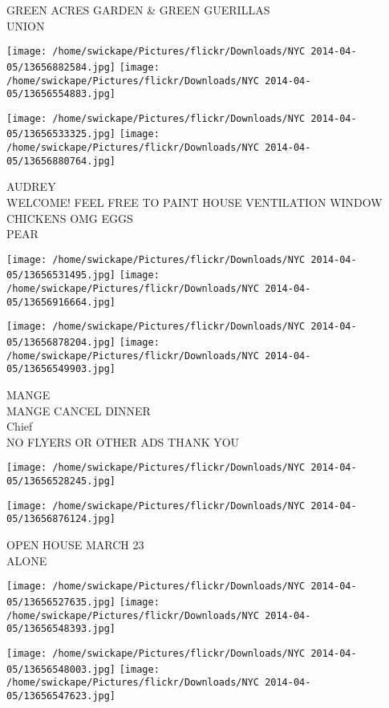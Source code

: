 \documentclass[10pt,letterpaper]{article}
\begin{document}
GREEN ACRES GARDEN \& GREEN GUERILLAS\\
UNION
\pagebreak

\texttt{[image: /home/swickape/Pictures/flickr/Downloads/NYC 2014-04-05/13656882584.jpg]}
\texttt{[image: /home/swickape/Pictures/flickr/Downloads/NYC 2014-04-05/13656554883.jpg]}

\texttt{[image: /home/swickape/Pictures/flickr/Downloads/NYC 2014-04-05/13656533325.jpg]}
\texttt{[image: /home/swickape/Pictures/flickr/Downloads/NYC 2014-04-05/13656880764.jpg]}

AUDREY\\
WELCOME!  FEEL FREE TO PAINT HOUSE  VENTILATION WINDOW\\
CHICKENS OMG EGGS\\
PEAR
\pagebreak

\texttt{[image: /home/swickape/Pictures/flickr/Downloads/NYC 2014-04-05/13656531495.jpg]}
\texttt{[image: /home/swickape/Pictures/flickr/Downloads/NYC 2014-04-05/13656916664.jpg]}

\texttt{[image: /home/swickape/Pictures/flickr/Downloads/NYC 2014-04-05/13656878204.jpg]}
\texttt{[image: /home/swickape/Pictures/flickr/Downloads/NYC 2014-04-05/13656549903.jpg]}

MANGE\\
MANGE CANCEL DINNER\\
Chief\\
NO FLYERS OR OTHER ADS THANK YOU
\pagebreak

\texttt{[image: /home/swickape/Pictures/flickr/Downloads/NYC 2014-04-05/13656528245.jpg]}

\vspace{0.25in}
\texttt{[image: /home/swickape/Pictures/flickr/Downloads/NYC 2014-04-05/13656876124.jpg]}

OPEN HOUSE MARCH 23\\
ALONE
\pagebreak

\texttt{[image: /home/swickape/Pictures/flickr/Downloads/NYC 2014-04-05/13656527635.jpg]}
\texttt{[image: /home/swickape/Pictures/flickr/Downloads/NYC 2014-04-05/13656548393.jpg]}

\texttt{[image: /home/swickape/Pictures/flickr/Downloads/NYC 2014-04-05/13656548003.jpg]}
\texttt{[image: /home/swickape/Pictures/flickr/Downloads/NYC 2014-04-05/13656547623.jpg]}
\end{document}
